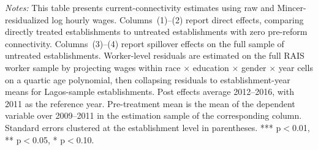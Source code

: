 \begin{table}[H]
\begin{minipage}{\linewidth}
\textit{Notes:} This table presents current-connectivity estimates using raw and Mincer-residualized log hourly wages. Columns~(1)--(2) report direct effects, comparing directly treated establishments to untreated establishments with zero pre-reform connectivity. Columns~(3)--(4) report spillover effects on the full sample of untreated establishments. Worker-level residuals are estimated on the full RAIS worker sample by projecting wages within race $\times$ education $\times$ gender $\times$ year cells on a quartic age polynomial, then collapsing residuals to establishment-year means for Lagos-sample establishments. Post effects average 2012--2016, with 2011 as the reference year. Pre-treatment mean is the mean of the dependent variable over 2009--2011 in the estimation sample of the corresponding column. Standard errors clustered at the establishment level in parentheses. *** p$<$0.01, ** p$<$0.05, * p$<$0.10.
\end{minipage}
\end{table}
